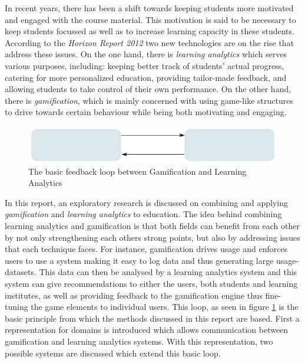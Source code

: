 \documentclass[11pt]{article}
\begin{document}
In recent years, there has been a shift towards keeping students more motivated and engaged with the course material. This motivation is said to be necessary to keep students focussed as well as to increase learning capacity in these students. According to the \emph{Horizon Report 2012} \cite{Horizon2012} two new technologies are on the rise that address these issues. On the one hand, there is \emph{learning analytics} which serves various purposes, including: keeping better track of students' actual progress, catering for more personalized education, providing tailor-made feedback, and allowing students to take control of their own performance. On the other hand, there is \emph{gamification}, which is mainly concerned with using game-like structures to drive towards certain behaviour while being both motivating and engaging. 

\begin{figure}[h!tb]
\centering
\includegraphics[width=0.7\linewidth]{GalaLoop}
\caption{The basic feedback loop between Gamification and Learning Analytics\label{fig:galaloop}}
\end{figure}

In this report, an exploratory research is discussed on combining and applying \emph{gamification} and \emph{learning analytics} to education. The idea behind combining learning analytics and gamification is that both fields can benefit from each other by not only strengthening each others strong points, but also by addressing issues that each technique faces. For instance, gamification drives usage and enforces users to use a system making it easy to log data and thus generating large usage-datasets. This data can then be analysed by a learning analytics system and this system can give recommendations to either the users, both students and learning institutes, as well as providing feedback to the gamification engine thus fine-tuning the game elements to individual users. This loop, as seen in figure \ref{fig:galaloop} is the basic principle from which the methods discussed in this report are based. First a representation for domains is introduced which allows communication between gamification and learning 
analytics systems. With this representation, two possible systems are discussed which extend this basic loop.


% 
% 
\end{document}
